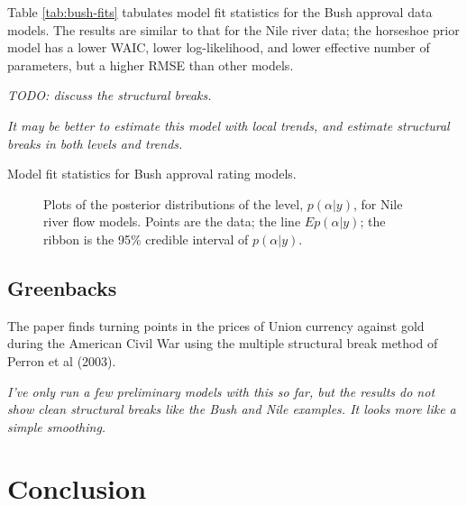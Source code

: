 \documentclass{article}
\begin{document}
Table \ref{tab:bush-fits} tabulates model fit statistics for the Bush approval data models. 
The results are similar to that for the Nile river data; the horseshoe prior model has a lower WAIC, lower log-likelihood, and lower effective number of parameters, but a higher RMSE than other models.

\textit{TODO: discuss the structural breaks.}

\textit{It may be better to estimate this model with local trends, and estimate structural breaks in both levels and trends.}

\begin{table}[htpb]
  \centering
  
  \caption{Model fit statistics for Bush approval rating models.}
  \label{tab:bush-fits}
\end{table}

\begin{figure}[htpb]
  \centering
  \begin{subfigure}{1.0\textwidth}
    \caption{}
    \label{fig:bush1}
  \end{subfigure}
  \begin{subfigure}{1.0\textwidth}
    \caption{}
    \label{fig:bush2}
  \end{subfigure}
  \caption{Plots of the posterior distributions of the level, $p(\alpha | y)$, for Nile river flow models. Points are the data; the line $E p(\alpha | y)$; the ribbon is the 95\% credible interval of $p(\alpha | y)$.}
  \label{fig:bush-posterior}
\end{figure}


\subsection{Greenbacks}
\label{sec:greenbacks}

The paper \textcite{WillardGuinnaneOmegal1996} finds turning points in the prices of Union currency against gold during the American Civil War using the multiple structural break method of Perron et al (2003).

\textit{I've only run a few preliminary models with this so far, but the results do not show clean structural breaks like the Bush and Nile examples. It looks more like a simple smoothing.}


\section{Conclusion}
\label{sec:conclusion}
\end{document}

